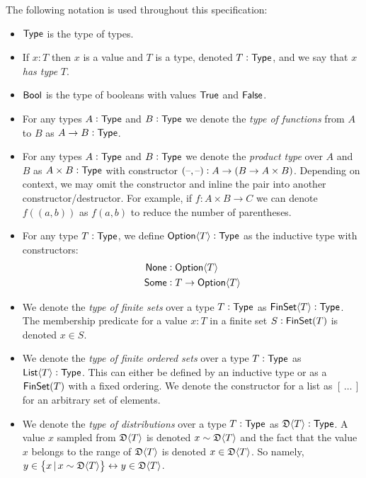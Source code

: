 
The following notation is used throughout this specification:

\begin{itemize}
    \item ${\textsf{Type}}$ is the type of types\footnotemark{}.
    \item If $x : T$ then $x$ is a value and $T$ is a type, denoted $T : {\textsf{Type}}$, and we say that $x$ \emph{has type} $T$.
    \item ${\textsf{Bool}}$ is the type of booleans with values ${\textsf{True}}$ and ${\textsf{False}}$.
    \item For any types $A : {\textsf{Type}}$ and $B : {\textsf{Type}}$ we denote the \emph{type of functions} from $A$ to $B$ as $A \to B : {\textsf{Type}}$.
    \item For any types $A : {\textsf{Type}}$ and $B : {\textsf{Type}}$ we denote the \emph{product type} over $A$ and $B$ as $A \times B : {\textsf{Type}}$ with constructor $({\textrm{--}}, {\textrm{--}}) : A \to (B \to A \times B)$. Depending on context, we may omit the constructor and inline the pair into another constructor/destructor. For example, if $f : A \times B \to C$ we can denote $f((a, b))$ as $f(a, b)$ to reduce the number of parentheses.
    \item For any type $T : {\textsf{Type}}$, we define ${\textsf{Option}}\langle{T}\rangle : {\textsf{Type}}$ as the inductive type with constructors:
        \begin{align*}
            {\textsf{None}} &: {\textsf{Option}}\langle{T}\rangle \\
            {\textsf{Some}} &: T \to {\textsf{Option}}\langle{T}\rangle
        \end{align*}
    \item We denote the \emph{type of finite sets} over a type $T : {\textsf{Type}}$ as ${\textsf{FinSet}}\langle{T}\rangle : {\textsf{Type}}$. The membership predicate for a value $x : T$ in a finite set $S : {\textsf{FinSet}}(T)$ is denoted $x \in S$.
    \item We denote the \emph{type of finite ordered sets} over a type $T : {\textsf{Type}}$ as ${\textsf{List}}\langle{T}\rangle : {\textsf{Type}}$. This can either be defined by an inductive type or as a ${\textsf{FinSet}}(T)$ with a fixed ordering. We denote the constructor for a list as $[\,\dots\,]$ for an arbitrary set of elements.
    \item We denote the \emph{type of distributions} over a type $T : {\textsf{Type}}$ as $\mathfrak{D}\langle{T}\rangle : {\textsf{Type}}$. A value $x$ sampled from $\mathfrak{D}\langle{T}\rangle$ is denoted $x \sim \mathfrak{D}\langle{T}\rangle$ and the fact that the value $x$ belongs to the range of $\mathfrak{D}\langle{T}\rangle$ is denoted $x \in \mathfrak{D}\langle{T}\rangle$. So namely, $y \in \set{x \,|\, x \sim \mathfrak{D}\langle{T}\rangle} \leftrightarrow y \in \mathfrak{D}\langle{T}\rangle$.

\end{itemize}
